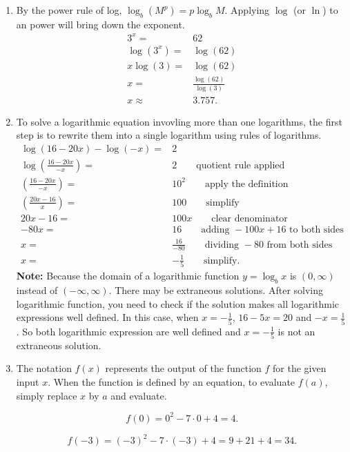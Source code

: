 \documentclass[
  12pt]{article}
\begin{document}
\begin{enumerate}
\def\labelenumi{\arabic{enumi}.}
\setcounter{enumi}{19}
\item
  By the power rule of log, \(\log_b(M^p)=p\log_bM\). Applying \(\log\)
  (or \(\ln\)) to an power will bring down the exponent. \[
  \begin{aligned}
  3^x=&62\\
  \log(3^x)=&\log(62)\\
  x\log(3)=&\log(62)\\
  x=&\frac{\log(62)}{\log(3)}\\
  x\approx & 3.757.
  \end{aligned}
  \]
\item
  To solve a logarithmic equation invovling more than one logarithms,
  the first step is to rewrite them into a single logarithm using rules
  of logarithms. \[
  \begin{aligned}
  \log(16-20x)-\log(-x)=&2\\
  \log\left(\frac{16-20x}{-x}\right)=&2\qquad \text{quotient rule applied}\\
  \left(\frac{16-20x}{-x}\right)=&10^2\qquad \text{apply the definition}\\
  \left(\frac{20x-16}{x}\right)=&100 \qquad \text{simplify}\\
  20x-16=&100x \qquad \text{clear denominator}\\
  -80x=&16 \qquad \text{adding } -100x+16 \text{ to both sides}\\
  x=&\frac{16}{-80} \qquad \text{dividing } -80 \text{ from both sides}\\
  x=&-\frac{1}{5} \qquad \text{simplify}.
  \end{aligned}
  \] \textbf{Note:} Because the domain of a logarithmic function
  \(y=\log_bx\) is \((0, \infty)\) instead of \((-\infty,\infty)\).
  There may be extraneous solutions. After solving logarithmic function,
  you need to check if the solution makes all logarithmic expressions
  well defined. In this case, when \(x=-\frac15\), \(16-5x=20\) and
  \(-x=\frac15\). So both logarithmic expression are well defined and
  \(x=-\frac15\) is not an extraneous solution.
\item
  The notation \(f(x)\) represents the output of the function \(f\) for
  the given input \(x\). When the function is defined by an equation, to
  evaluate \(f(a)\), simply replace \(x\) by \(a\) and evaluate.

  \[f(0)=0^2-7\cdot 0 +4=4.\]

  \[f(-3)=(-3)^2-7\cdot (-3) + 4=9+21+4=34.\]


\end{enumerate}
\end{document}
